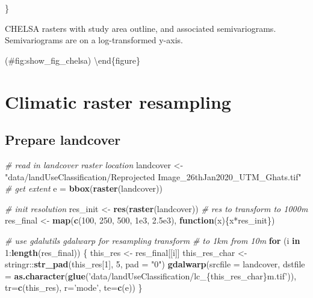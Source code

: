 \documentclass[]{article}
\newenvironment{Shaded}{}{}
\newcommand{\CommentTok}[1]{\textcolor[rgb]{0.38,0.63,0.69}{\textit{#1}}}
\newcommand{\ControlFlowTok}[1]{\textcolor[rgb]{0.00,0.44,0.13}{\textbf{#1}}}
\newcommand{\DataTypeTok}[1]{\textcolor[rgb]{0.56,0.13,0.00}{#1}}
\newcommand{\DecValTok}[1]{\textcolor[rgb]{0.25,0.63,0.44}{#1}}
\newcommand{\FloatTok}[1]{\textcolor[rgb]{0.25,0.63,0.44}{#1}}
\newcommand{\KeywordTok}[1]{\textcolor[rgb]{0.00,0.44,0.13}{\textbf{#1}}}
\newcommand{\NormalTok}[1]{#1}
\newcommand{\OperatorTok}[1]{\textcolor[rgb]{0.40,0.40,0.40}{#1}}
\newcommand{\StringTok}[1]{\textcolor[rgb]{0.25,0.44,0.63}{#1}}
\begin{document}
\}

\caption{CHELSA rasters with study area outline, and associated semivariograms. Semivariograms are on a log-transformed y-axis.}

(\#fig:show\_fig\_chelsa)
\textbackslash{}end\{figure\}

\hypertarget{climatic-raster-resampling}{%
\section{Climatic raster resampling}\label{climatic-raster-resampling}}

\hypertarget{prepare-landcover}{%
\subsection{Prepare landcover}\label{prepare-landcover}}

\begin{Shaded}
\begin{Highlighting}[]
\CommentTok{# read in landcover raster location}
\NormalTok{landcover <-}\StringTok{ "data/landUseClassification/Reprojected Image_26thJan2020_UTM_Ghats.tif"}
\CommentTok{# get extent}
\NormalTok{e =}\StringTok{ }\KeywordTok{bbox}\NormalTok{(}\KeywordTok{raster}\NormalTok{(landcover))}

\CommentTok{# init resolution}
\NormalTok{res_init <-}\StringTok{ }\KeywordTok{res}\NormalTok{(}\KeywordTok{raster}\NormalTok{(landcover))}
\CommentTok{# res to transform to 1000m}
\NormalTok{res_final <-}\StringTok{ }\KeywordTok{map}\NormalTok{(}\KeywordTok{c}\NormalTok{(}\DecValTok{100}\NormalTok{, }\DecValTok{250}\NormalTok{, }\DecValTok{500}\NormalTok{, }\FloatTok{1e3}\NormalTok{, }\FloatTok{2.5e3}\NormalTok{), }\ControlFlowTok{function}\NormalTok{(x)\{x}\OperatorTok{*}\NormalTok{res_init\})}

\CommentTok{# use gdalutils gdalwarp for resampling transform}
\CommentTok{# to 1km from 10m}
\ControlFlowTok{for}\NormalTok{ (i }\ControlFlowTok{in} \DecValTok{1}\OperatorTok{:}\KeywordTok{length}\NormalTok{(res_final)) \{}
\NormalTok{  this_res <-}\StringTok{ }\NormalTok{res_final[[i]]}
\NormalTok{  this_res_char <-}\StringTok{ }\NormalTok{stringr}\OperatorTok{::}\KeywordTok{str_pad}\NormalTok{(this_res[}\DecValTok{1}\NormalTok{], }\DecValTok{5}\NormalTok{, }\DataTypeTok{pad =} \StringTok{"0"}\NormalTok{)}
  \KeywordTok{gdalwarp}\NormalTok{(}\DataTypeTok{srcfile =}\NormalTok{ landcover, }
          \DataTypeTok{dstfile =} \KeywordTok{as.character}\NormalTok{(}\KeywordTok{glue}\NormalTok{(}\StringTok{'data/landUseClassification/lc_\{this_res_char\}m.tif'}\NormalTok{)), }
          \DataTypeTok{tr=}\KeywordTok{c}\NormalTok{(this_res), }\DataTypeTok{r=}\StringTok{'mode'}\NormalTok{, }\DataTypeTok{te=}\KeywordTok{c}\NormalTok{(e))}
\NormalTok{\}}
\end{Highlighting}
\end{Shaded}
\end{document}

